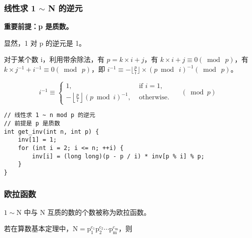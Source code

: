 \documentclass[UTF8]{article}
\begin{document}
\subsubsection{线性求 1 $\sim$ N 的逆元}
\textbf{重要前提：p 是质数。}

显然，1 对 p 的逆元是 1。

对于某个数 i，利用带余除法，有 $p = k \times i + j$，有 $k \times i + j \equiv 0 (\bmod\ p)$，有  $k \times j ^ {-1} + i ^ {-1} \equiv 0 (\bmod\ p)$，即 $i ^ {-1} \equiv -\lfloor \frac{p}{i} \rfloor \times (p \bmod\ i)^{-1} (\bmod\ p)$。

$$
i^{-1} \equiv\left\{\begin{array}{ll}
1, & \text { if } i=1, \\
-\left\lfloor\frac{p}{i}\right\rfloor(p \bmod i)^{-1}, & \text { otherwise. }
\end{array} \quad(\bmod p)\right.
$$

\begin{lstlisting}[caption=线性求逆元]
// 线性求 1 ~ n mod p 的逆元
// 前提是 p 是质数
int get_inv(int n, int p) {
	inv[1] = 1;
	for (int i = 2; i <= n; ++i) {
 		inv[i] = (long long)(p - p / i) * inv[p % i] % p;
	}
}
\end{lstlisting}


\subsubsection{欧拉函数}
$\mathrm{1 \sim N}$ 中与 $\mathrm{N}$ 互质的数的个数被称为欧拉函数。

若在算数基本定理中，$\mathrm{N = p_1^{c_1}p_2^{c_2}\cdots p_m^{c_m}}$，则
\end{document}
